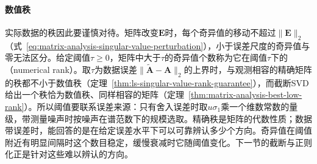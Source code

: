 \paragraph{数值秩}
实际数据的秩因此要谨慎对待。矩阵改变$\bm E$时，每个奇异值的移动不超过$\lVert\bm E\rVert_2$（式~\eqref{eq:matrix-analysis-singular-value-perturbation}），小于误差尺度的奇异值与零无法区分。给定阈值$\tau\geq0$，矩阵中大于$\tau$的奇异值个数称为它在阈值$\tau$下的（numerical rank）。取$\tau$为数据误差$\lVert\tilde{\bm A}-\bm A\rVert_2$的上界时，与观测相容的精确矩阵的秩都不小于数值秩（定理~\ref{thm:ls-singular-value-rank-guarantee}），而截断SVD给出一个秩恰为数值秩、同样相容的矩阵（定理~\ref{thm:matrix-analysis-best-low-rank}）。所以阈值要联系误差来源：只有舍入误差时取$u\sigma_1$乘一个维数常数的量级，带测量噪声时按噪声在谱范数下的规模选取。精确秩是矩阵的代数性质；数据带误差时，能回答的是在给定误差水平下可以可靠辨认多少个方向。奇异值在阈值附近有明显间隔时这个数目稳定，缓慢衰减时它随阈值变化。下一节的截断与正则化正是针对这些难以辨认的方向。
